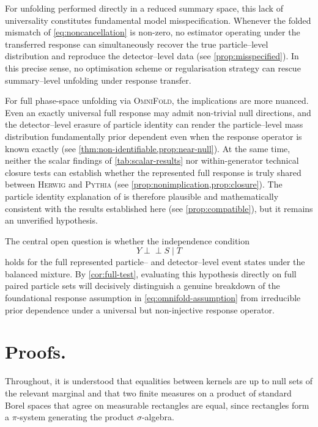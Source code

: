 \documentclass[12pt]{article}
\newcommand{\indep}{\perp\!\!\!\perp}
\newcommand{\1}{\mathbbm{1}}
\renewcommand{\[}{\begin{equation}}
\renewcommand{\]}{\end{equation}}
\begin{document}
    For unfolding performed directly in a reduced summary space, this lack of universality constitutes fundamental model misspecification.
    Whenever the folded mismatch of \cref{eq:noncancellation} is non-zero, no estimator operating under the transferred response can simultaneously recover the true particle--level distribution and reproduce the detector--level data (see \cref{prop:misspecified}).
    In this precise sense, no optimisation scheme or regularisation strategy can rescue summary--level unfolding under response transfer.

    For full phase-space unfolding via \textsc{OmniFold}, the implications are more nuanced.
    Even an exactly universal full response may admit non-trivial null directions, and the detector--level erasure of particle identity can render the particle--level mass distribution fundamentally prior dependent even when the response operator is known exactly (see \cref{thm:non-identifiable,prop:near-null}).
    At the same time, neither the scalar findings of \cref{tab:scalar-results} nor within-generator technical closure tests can establish whether the represented full response is truly shared between \textsc{Herwig} and \textsc{Pythia} (see \cref{prop:nonimplication,prop:closure}).
    The particle identity explanation of \textcite{Andreassen:2019cjw} is therefore plausible and mathematically consistent with the results established here (see \cref{prop:compatible}), but it remains an unverified hypothesis.

    The central open question is whether the independence condition
    \[
        Y \indep S \mid T
    \]
    holds for the full represented particle-- and detector--level event states under the balanced mixture.
    By \cref{cor:full-test}, evaluating this hypothesis directly on full paired particle sets will decisively distinguish a genuine breakdown of the foundational response assumption in \cref{eq:omnifold-assumption} from irreducible prior dependence under a universal but non-injective response operator.

\printbibliography

\appendix
{}
\section{Proofs.}
\label{app:proofs}

    Throughout, it is understood that equalities between kernels are up to null sets of the relevant marginal and that two finite measures on a product of standard Borel spaces that agree on measurable rectangles are equal, since rectangles form a \(\pi\)-system generating the product \(\sigma\)-algebra.
\end{document}
